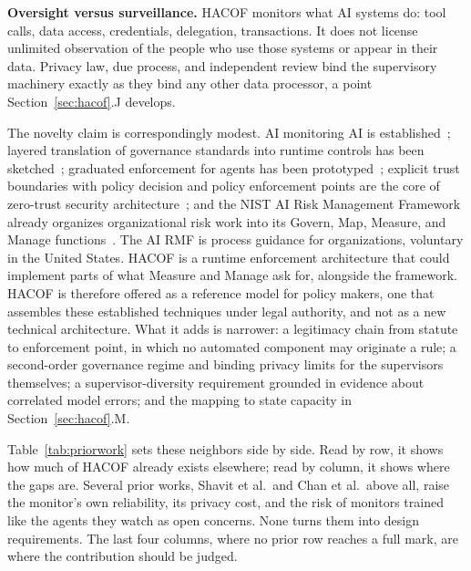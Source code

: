 \documentclass[journal]{IEEEtran}
\newcommand{\hacof}{HACOF}
\begin{document}
\textbf{Oversight versus surveillance.} \hacof{} monitors what AI systems do: tool calls, data access, credentials, delegation, transactions. It does not license unlimited observation of the people who use those systems or appear in their data. Privacy law, due process, and independent review bind the supervisory machinery exactly as they bind any other data processor, a point Section~\ref{sec:hacof}.J develops.

The novelty claim is correspondingly modest. AI monitoring AI is established~\cite{greenblatt2024aicontrol,shavit2023agentic,gosmar2025sentinel};
layered translation of governance standards into runtime controls has been sketched~\cite{koch2026layered};
graduated enforcement for agents has been prototyped~\cite{gaurav2025gaas,wang2025mi9};
explicit trust boundaries with policy decision and policy enforcement points are the core of zero-trust security architecture~\cite{nist2020zerotrust};
and the NIST AI Risk Management Framework already organizes organizational risk work into its Govern, Map, Measure, and Manage functions~\cite{nist2023airmf}.
The AI RMF is process guidance for organizations, voluntary in the United States. \hacof{} is a runtime enforcement architecture that could implement parts of what Measure and Manage ask for, alongside the framework. \hacof{} is therefore offered as a reference model for policy makers, one that assembles these established techniques under legal authority, and not as a new technical architecture. What it adds is narrower: a legitimacy chain from statute to enforcement point, in which no automated component may originate a rule; a second-order governance regime and binding privacy limits for the supervisors themselves; a supervisor-diversity requirement grounded in evidence about correlated model errors; and the mapping to state capacity in Section~\ref{sec:hacof}.M.

Table~\ref{tab:priorwork} sets these neighbors side by side. Read by row, it shows how much of \hacof{} already exists elsewhere; read by column, it shows where the gaps are. Several prior works, Shavit et al.\ and Chan et al.\ above all, raise the monitor's own reliability, its privacy cost, and the risk of monitors trained like the agents they watch as open concerns. None turns them into design requirements. The last four columns, where no prior row reaches a full mark, are where the contribution should be judged.
\end{document}
